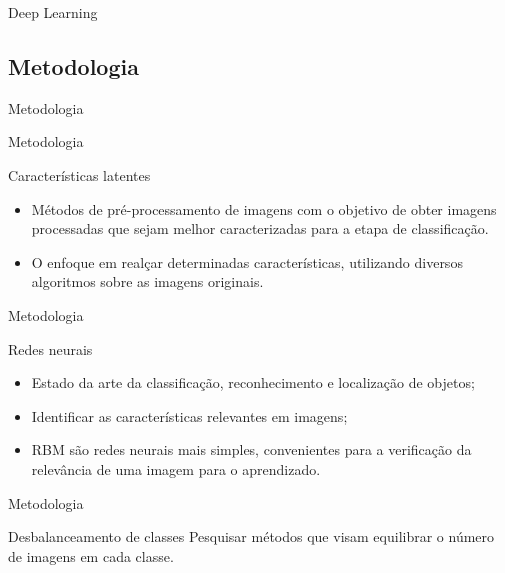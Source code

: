 \documentclass{beamer}
\begin{document}
\begin{frame}{Deep Learning}
\subsection{Metodologia}
\begin{frame}{Metodologia}
\end{frame}
\begin{frame}{Metodologia}
\begin{block}{Características latentes}
\justifying
\begin{itemize}
\item Métodos de pré-processamento de imagens com o objetivo de obter imagens processadas que sejam melhor caracterizadas para a etapa de classificação. 
\item O enfoque em realçar determinadas características, utilizando diversos algoritmos sobre as imagens originais.
\end{itemize}
\end{block}
\end{frame}
\begin{frame}{Metodologia}
\begin{block}{Redes neurais}
\justifying
\begin{itemize}
\item Estado da arte da classificação, reconhecimento e localização de objetos;
\item Identificar as características relevantes em imagens;
\item RBM são redes neurais mais simples, convenientes para a verificação da relevância de uma imagem para o aprendizado.
\end{itemize}
\end{block}
\end{frame}
\begin{frame}{Metodologia}
\begin{block}{Desbalanceamento de classes}
\justifying
Pesquisar métodos que visam equilibrar o número de imagens em cada classe.
\end{block}
\end{frame}

\end{frame}
\end{document}
